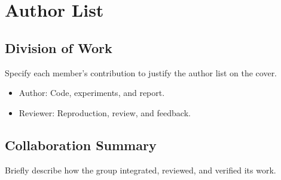 \section{Author List}

\subsection{Division of Work}

Specify each member's contribution to justify the author list on the cover.

\begin{itemize}[leftmargin=2em]
  \item Author: Code, experiments, and report.
  \item Reviewer: Reproduction, review, and feedback.
\end{itemize}

\subsection{Collaboration Summary}

Briefly describe how the group integrated, reviewed, and verified its work.
